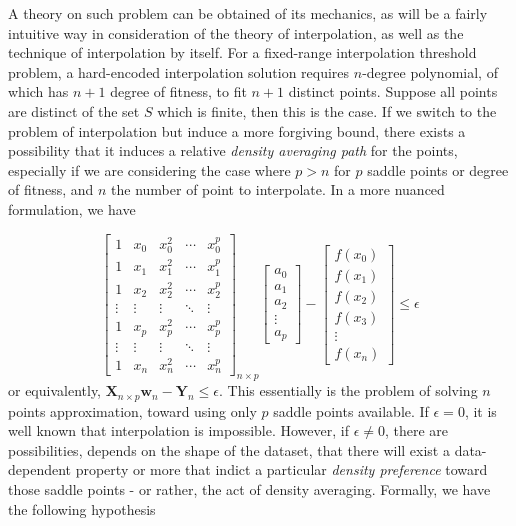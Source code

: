 \documentclass[10pt]{article}
\begin{document}
A theory on such problem can be obtained of its mechanics, as will be a fairly intuitive way in consideration of the theory of interpolation, as well as the technique of interpolation by itself. For a fixed-range interpolation threshold problem, a hard-encoded interpolation solution requires $n$-degree polynomial, of which has $n+1$ degree of fitness, to fit $n+1$ distinct points. Suppose all points are distinct of the set $S$ which is finite, then this is the case. If we switch to the problem of interpolation but induce a more forgiving bound, there exists a possibility that it induces a relative \textit{density averaging path} for the points, especially if we are considering the case where $p>n$ for $p$ saddle points or degree of fitness, and $n$ the number of point to interpolate. In a more nuanced formulation, we have

\begin{equation}\label{eq:soft_hard_interpolation_role}
\begin{bmatrix}
1 & x_0 & x_0^2 & \cdots & x_0^p \\
1 & x_1 & x_1^2 & \cdots & x_1^p \\
1 & x_2 & x_2^2 & \cdots & x_2^p \\
\vdots & \vdots & \vdots & \ddots & \vdots \\
1 & x_p & x_p^2 & \cdots & x_p^p \\
\vdots & \vdots & \vdots & \ddots & \vdots \\
1 & x_n & x_n^2 & \cdots & x_n^p
\end{bmatrix}_{n\times p}
\begin{bmatrix}
a_0 \\
a_1 \\
a_2 \\
\vdots \\
a_p
\end{bmatrix}
- 
\begin{bmatrix}
f(x_0) \\
f(x_1) \\
f(x_2) \\
f(x_3) \\
\vdots \\
f(x_n)
\end{bmatrix}
\leq \epsilon
\end{equation}
or equivalently, $\mathbf{X}_{n\times p}\mathbf{w}_{n}-\mathbf{Y}_{n}\leq \epsilon$. This essentially is the problem of solving $n$ points approximation, toward using only $p$ saddle points available. If $\epsilon =0$, it is well known that interpolation is impossible. However, if $\epsilon\ne 0$, there are possibilities, depends on the shape of the dataset, that there will exist a data-dependent property or more that indict a particular \textit{density preference} toward those saddle points - or rather, the act of density averaging. Formally, we have the following hypothesis
\end{document}
